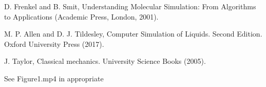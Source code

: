 \documentclass[twocolumn,preprintnumbers,amsmath,amssymb,aps,prx]{revtex4}
\begin{document}
\begin{thebibliography}{99}

     D. Frenkel and B. Smit, Understanding Molecular Simulation: From Algorithms to Applications (Academic Press, London, 2001).
      
     M. P. Allen and D. J. Tildesley, Computer Simulation of Liquids.  Second Edition. Oxford University Press (2017).

     J. Taylor,  Classical mechanics. University Science Books (2005).
      
 See Figure1.mp4 in appropriate %













\end{thebibliography}
\end{document}
